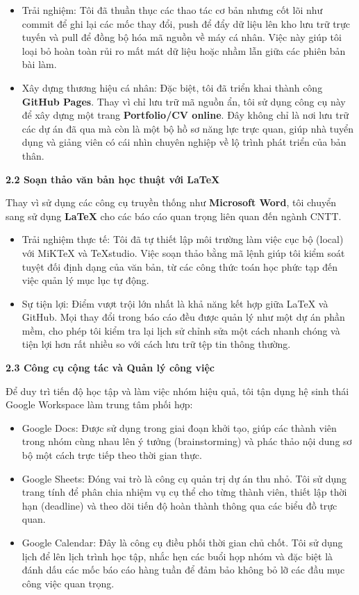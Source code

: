 \documentclass[
]{article}
\begin{document}
\begin{itemize}
\item
  Trải nghiệm: Tôi đã thuần thục các thao tác cơ bản nhưng cốt lõi như
  commit để ghi lại các mốc thay đổi, push để đẩy dữ liệu lên kho lưu
  trữ trực tuyến và pull để đồng bộ hóa mã nguồn về máy cá nhân. Việc
  này giúp tôi loại bỏ hoàn toàn rủi ro mất mát dữ liệu hoặc nhầm lẫn
  giữa các phiên bản bài làm.
\item
  Xây dựng thương hiệu cá nhân: Đặc biệt, tôi đã triển khai thành công
  \textbf{GitHub Pages}. Thay vì chỉ lưu trữ mã nguồn ẩn, tôi sử dụng
  công cụ này để xây dựng một trang \textbf{Portfolio/CV online}. Đây
  không chỉ là nơi lưu trữ các dự án đã qua mà còn là một bộ hồ sơ năng
  lực trực quan, giúp nhà tuyển dụng và giảng viên có cái nhìn chuyên
  nghiệp về lộ trình phát triển của bản thân.
\end{itemize}

\textbf{2.2 Soạn thảo văn bản học thuật với LaTeX}

Thay vì sử dụng các công cụ truyền thống như \textbf{Microsoft Word},
tôi chuyển sang sử dụng \textbf{LaTeX} cho các báo cáo quan trọng liên
quan đến ngành CNTT.

\begin{itemize}
\item
  Trải nghiệm thực tế: Tôi đã tự thiết lập môi trường làm việc cục bộ
  (local) với MiKTeX và TeXstudio. Việc soạn thảo bằng mã lệnh giúp tôi
  kiểm soát tuyệt đối định dạng của văn bản, từ các công thức toán học
  phức tạp đến việc quản lý mục lục tự động.
\item
  Sự tiện lợi: Điểm vượt trội lớn nhất là khả năng kết hợp giữa LaTeX và
  GitHub. Mọi thay đổi trong báo cáo đều được quản lý như một dự án phần
  mềm, cho phép tôi kiểm tra lại lịch sử chỉnh sửa một cách nhanh chóng
  và tiện lợi hơn rất nhiều so với cách lưu trữ tệp tin thông thường.
\end{itemize}

\textbf{2.3 Công cụ cộng tác và Quản lý công việc}

Để duy trì tiến độ học tập và làm việc nhóm hiệu quả, tôi tận dụng hệ
sinh thái Google Workspace làm trung tâm phối hợp:

\begin{itemize}
\item
  Google Docs: Được sử dụng trong giai đoạn khởi tạo, giúp các thành
  viên trong nhóm cùng nhau lên ý tưởng (brainstorming) và phác thảo nội
  dung sơ bộ một cách trực tiếp theo thời gian thực.
\item
  Google Sheets: Đóng vai trò là công cụ quản trị dự án thu nhỏ. Tôi sử
  dụng trang tính để phân chia nhiệm vụ cụ thể cho từng thành viên,
  thiết lập thời hạn (deadline) và theo dõi tiến độ hoàn thành thông qua
  các biểu đồ trực quan.
\item
  Google Calendar: Đây là công cụ điều phối thời gian chủ chốt. Tôi sử
  dụng lịch để lên lịch trình học tập, nhắc hẹn các buổi họp nhóm và đặc
  biệt là đánh dấu các mốc báo cáo hàng tuần để đảm bảo không bỏ lỡ các
  đầu mục công việc quan trọng.
\end{itemize}
\end{document}
